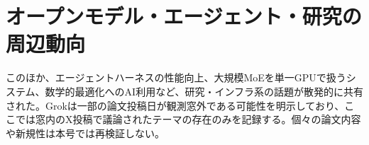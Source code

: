 \section{オープンモデル・エージェント・研究の周辺動向}
このほか、エージェントハーネスの性能向上、大規模MoEを単一GPUで扱うシステム、数学的最適化へのAI利用など、研究・インフラ系の話題が散発的に共有された。Grokは一部の論文投稿日が観測窓外である可能性を明示しており、ここでは窓内のX投稿で議論されたテーマの存在のみを記録する。個々の論文内容や新規性は本号では再検証しない。
